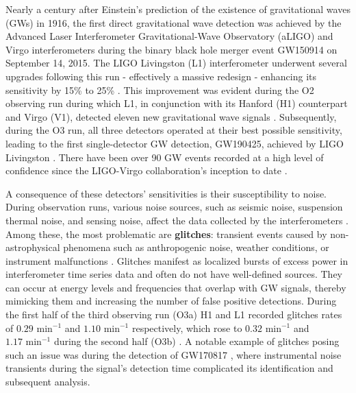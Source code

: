\documentclass[12pt]{article}
\begin{document}
\noindent Nearly a century after Einstein's prediction of the existence of gravitational waves (GWs) in 1916, the first direct gravitational wave detection was achieved by the Advanced Laser Interferometer Gravitational-Wave Observatory (aLIGO) \cite{Abbott_LIGO_2016} and Virgo \cite{Accadia_virgo_2012} interferometers during the binary black hole merger event GW150914 on September 14, 2015. The LIGO Livingston (L1) interferometer underwent several upgrades following this run - effectively a massive redesign - enhancing its sensitivity by 15\% to 25\% \cite{grant_advanced_2016}. This improvement was evident during the O2 observing run during which L1, in conjunction with its Hanford (H1) counterpart and Virgo (V1), detected eleven new gravitational wave signals \cite{collaboration_gwtc-1_2019}. Subsequently, during the O3 run, all three detectors operated at their best possible sensitivity, leading to the first single-detector GW detection, GW190425, achieved by LIGO Livingston \cite{abbott_gwtc-2_2021}. There have been over 90 GW events recorded at a high level of confidence since the LIGO-Virgo collaboration's inception to date \cite{collaboration_gwtc-3_2023}.

\medskip
\noindent A consequence of these detectors' sensitivities is their susceptibility to noise. During observation runs, various noise sources, such as seismic noise, suspension thermal noise, and sensing noise, affect the data collected by the interferometers \cite{Li:2013lza}. Among these, the most problematic are \textbf{glitches}: transient events caused by non-astrophysical phenomena such as anthropogenic noise, weather conditions, or instrument malfunctions \cite{collaboration_guide_2020, collaboration_characterization_2016}. Glitches manifest as localized bursts of excess power in interferometer time series data and often do not have well-defined sources. They can occur at energy levels and frequencies that overlap with GW signals, thereby mimicking them and increasing the number of false positive detections. During the first half of the third observing run (O3a) H1 and L1 recorded glitches rates of $0.29\text{ min}^{-1}$ and $1.10\text{ min}^{-1}$ respectively, which rose to $0.32\text{ min}^{-1}$ and $1.17\text{ min}^{-1}$ during the second half (O3b) \cite{collaboration_gwtc-3_2023}. A notable example of glitches posing such an issue was during the detection of GW170817 \cite{collaboration_gw170817_2017}, where instrumental noise transients during the signal's detection time complicated its identification and subsequent analysis.
\end{document}
